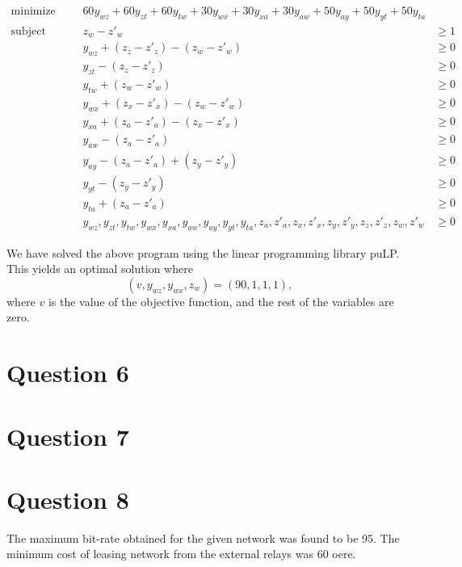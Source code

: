 \documentclass[a4paper, 10pt, oneside, article]{memoir}
\begin{document}
\begin{align*}
\text{minimize}   &&& 60y_{wz} + 60y_{zt} + 60y_{tw} + 30y_{wx} + 30y_{xa} + 30y_{aw} + 50y_{ay} + 50y_{yt} + 50y_{ta}  \\
\text{subject to} &&& z_{w}  -z'_{w} &\geq 1 \\
                  &&&y_{wz} + (z_{z}  -z'_{z})  - (z_{w} - z'_{w}) &\geq 0 \\
                  &&&y_{zt}  - (z_{z} - z'_{z}) &\geq 0 \\
                  &&&y_{tw} + (z_{w}  -z'_{w}) &\geq 0 \\
                  &&&y_{wx} + (z_{x}  -z'_{x})  -(z_{w} -  z'_{w}) &\geq 0 \\
                  &&&y_{xa} + (z_{a}  -z'_{a})  -(z_{x} - z'_{x}) &\geq 0 \\
                  &&&y_{aw}  -(z_{a} - z'_{a}) &\geq 0 \\
                  &&&y_{ay}  -(z_{a} - z'_{a}) + (z_{y}  -z'_{y}) &\geq 0 \\
                  &&&y_{yt}  -(z_{y} - z'_{y}) &\geq 0 \\
                  &&&y_{ta} + (z_{a}  -z'_{a}) &\geq 0 \\
                  &&& y_{wz}, y_{zt}, y_{tw}, y_{wx}, y_{xa}, y_{aw}, y_{ay}, y_{yt}, y_{ta}, z_{a}, z'_{a}, z_{x}, z'_{x}, z_{y}, z'_{y}, z_{z}, z'_{z}, z_{w}, z'_{w} &\geq 0
\end{align*}

We have solved the above program using the linear programming library
puLP. This yields an optimal solution where
\begin{equation*}
(v, y_{wz}, y_{wx}, z_{w}) =(90, 1, 1, 1),
\end{equation*}
where $v$ is the value of the objective function, and the rest of the
variables are zero.

\section*{Question 6}




\section*{Question 7}

\section*{Question 8}
The maximum bit-rate obtained for the given network was found to be 95. The minimum cost of leasing network from the external relays was  60 oere.
\end{document}
